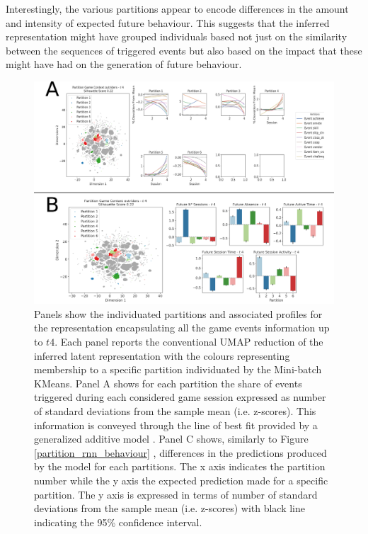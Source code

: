 Interestingly, the various partitions appear to encode differences in the amount and intensity of expected future behaviour. This suggests that the inferred representation might have grouped individuals based not just on the similarity between the sequences of triggered events but also based on the impact that these might have had on the generation of future behaviour.

\label{partition_event}
\begin{figure}[htbp]
\includegraphics[width=\textwidth]{images/chapter_4/clust_even_outr.png}
\centering
\caption[\textbf{Partitions of the representations generated by the RNN architectures from the game events metrics}]{Panels show the individuated partitions and associated profiles for the representation encapsulating all the game events information up to $t4$. Each panel reports the conventional UMAP reduction of the inferred latent representation with the colours representing membership to a specific partition individuated by the Mini-batch KMeans. Panel A shows for each partition the share of events triggered during each considered game session expressed as number of standard deviations from the sample mean (i.e. z-scores). This information is conveyed through the line of best fit provided by a generalized additive model \cite{serven2018}. Panel C shows, similarly to Figure \ref{partition_rnn_behaviour} , differences in the predictions produced by the model for each partitions. The x axis indicates the partition number while the y axis the expected prediction made for a specific partition. The y axis is expressed in terms of number of standard deviations from the sample mean (i.e. z-scores) with black line indicating the 95\% confidence interval.}
\label{clust_even_outr} 
\end{figure}

